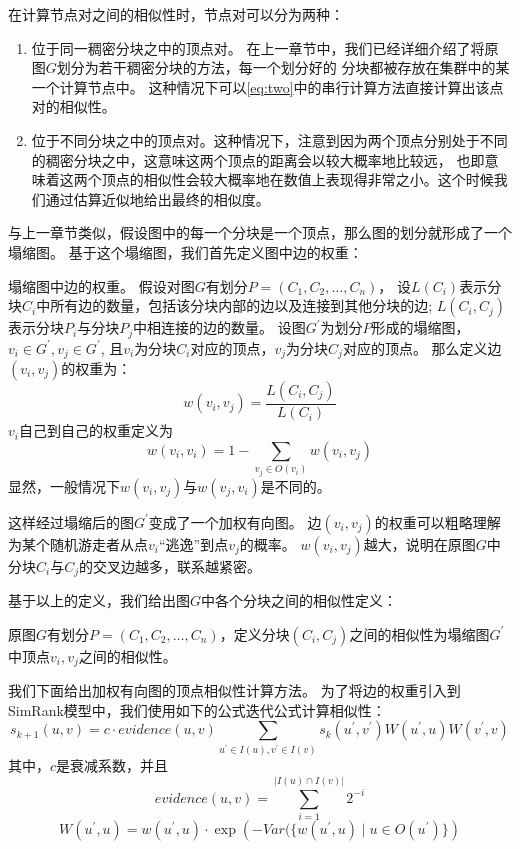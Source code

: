 \documentclass[master]{njuthesis}
\begin{document}
在计算节点对之间的相似性时，节点对可以分为两种：
\begin{enumerate}
 \item 位于同一稠密分块之中的顶点对。 在上一章节中，我们已经详细介绍了将原图$G$划分为若干稠密分块的方法，每一个划分好的
 分块都被存放在集群中的某一个计算节点中。 这种情况下可以\ref{eq:two}中的串行计算方法直接计算出该点对的相似性。
 \item 位于不同分块之中的顶点对。这种情况下，注意到因为两个顶点分别处于不同的稠密分块之中，这意味这两个顶点的距离会以较大概率地比较远，
 也即意味着这两个顶点的相似性会较大概率地在数值上表现得非常之小。这个时候我们通过估算近似地给出最终的相似度。
\end{enumerate}
与上一章节类似，假设图中的每一个分块是一个顶点，那么图的划分就形成了一个塌缩图。
基于这个塌缩图，我们首先定义图中边的权重：
\begin{definition}
 塌缩图中边的权重。 假设对图$G$有划分$P=(C_1, C_2, \dots, C_n)$，
 设$L(C_i)$表示分块$C_i$中所有边的数量，包括该分块内部的边以及连接到其他分块的边;
 $L(C_i, C_j)$表示分块$P_i$与分块$P_j$中相连接的边的数量。
 设图$G^\prime$为划分$P$形成的塌缩图，$v_i \in G^\prime, v_j \in G^\prime$, 
 且$v_i$为分块$C_i$对应的顶点，$v_j$为分块$C_j$对应的顶点。
 那么定义边$(v_i, v_j)$的权重为：
\begin{equation}
 w(v_i, v_j) = \frac{L(C_i, C_j)}{L(C_i)} 
\end{equation}
$v_i$自己到自己的权重定义为
\begin{equation}
 w(v_i, v_i) = 1-\sum_{v_j \in O(v_i)}{w(v_i, v_j)}
 \end{equation}
显然，一般情况下$w(v_i, v_j)$与$w(v_j, v_i)$是不同的。
\end{definition}
这样经过塌缩后的图$G^\prime$变成了一个加权有向图。
边$(v_i, v_j)$的权重可以粗略理解为某个随机游走者从点$v_i$“逃逸”到点$v_j$的概率。
$w(v_i, v_j)$越大，说明在原图$G$中分块$C_i$与$C_j$的交叉边越多，联系越紧密。

基于以上的定义，我们给出图$G$中各个分块之间的相似性定义：
\begin{definition}
 原图$G$有划分$P=(C_1, C_2, \dots, C_n)$，定义分块$(C_i, C_j)$之间的相似性为塌缩图$G^\prime$中顶点$v_i,v_j$之间的相似性。
\end{definition}
我们下面给出加权有向图的顶点相似性计算方法。
 为了将边的权重引入到SimRank模型中，我们使用如下的公式迭代公式计算相似性：
\begin{equation}
  s_{k+1}(u,v) = c \cdot evidence(u,v)  
  \sum_{u^\prime \in I(u), v^\prime \in I(v)} s_{k}(u^\prime, v^\prime)W(u^\prime, u)W(v^\prime, v)
\end{equation}
其中，$c$是衰减系数，并且
\begin{equation}
    evidence(u,v)=\sum_{i=1}^{|I(u)\cap I(v)|}2^{-i} 
   \end{equation}
\begin{equation}
     W(u^\prime, u)=w(u^\prime, u)\cdot \exp(-{Var(\{w(u^\prime,u) \mid u \in O(u^\prime)\}})
\end{equation}
\end{document}
